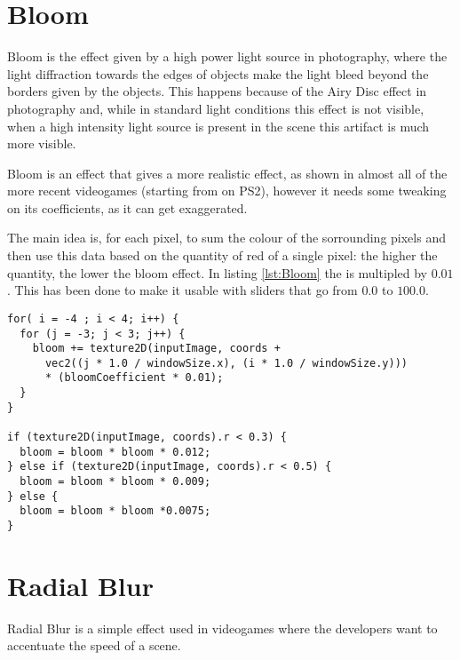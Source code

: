 
\section{Bloom}

  Bloom is the effect given by a high power light source in photography, where the light diffraction towards the edges
  of objects make the light bleed beyond the borders given by the objects. This happens because of the Airy Disc effect
  in photography and, while in standard light conditions this effect is not visible, when a high intensity light source is
  present in the scene this artifact is much more visible.
  
  Bloom is an effect that gives a more realistic effect, as shown in almost all of the more recent videogames (starting from
   on PS2), however it needs some tweaking on its coefficients, as it can get exaggerated.
  
  The main idea is, for each pixel, to sum the colour of the sorrounding pixels and then use this data based on the quantity
  of red of a single pixel: the higher the quantity, the lower the bloom effect. In listing \ref{lst:Bloom} the 
  is multipled by $0.01$. This has been done to make it usable with sliders that go from $0.0$ to $100.0$.
  
  \label{lst:Bloom}\begin{lstlisting}
for( i = -4 ; i < 4; i++) {
  for (j = -3; j < 3; j++) {
    bloom += texture2D(inputImage, coords +
      vec2((j * 1.0 / windowSize.x), (i * 1.0 / windowSize.y)))
      * (bloomCoefficient * 0.01);
  }
}
  
if (texture2D(inputImage, coords).r < 0.3) {
  bloom = bloom * bloom * 0.012;
} else if (texture2D(inputImage, coords).r < 0.5) {
  bloom = bloom * bloom * 0.009;
} else {
  bloom = bloom * bloom *0.0075;
}
  \end{lstlisting}


\section{Radial Blur}

  Radial Blur is a simple effect used in videogames where the developers want to accentuate the speed of a scene.
  
